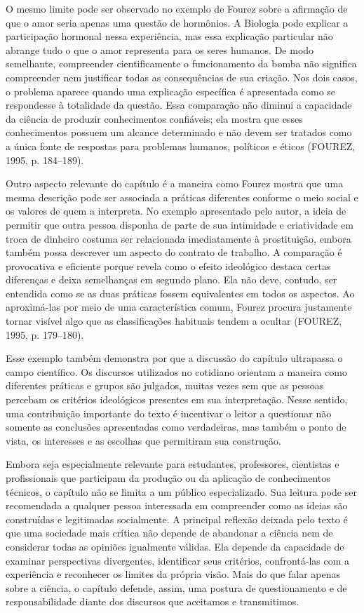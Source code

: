\documentclass[12pt,a4paper]{article}
\begin{document}
O mesmo limite pode ser observado no exemplo de Fourez sobre a afirmação de
que o amor seria apenas uma questão de hormônios. A Biologia pode explicar a
participação hormonal nessa experiência, mas essa explicação particular não
abrange tudo o que o amor representa para os seres humanos. De modo
semelhante, compreender cientificamente o funcionamento da bomba não
significa compreender nem justificar todas as consequências de sua criação.
Nos dois casos, o problema aparece quando uma explicação específica é
apresentada como se respondesse à totalidade da questão. Essa comparação não
diminui a capacidade da ciência de produzir conhecimentos confiáveis; ela
mostra que esses conhecimentos possuem um alcance determinado e não devem
ser tratados como a única fonte de respostas para problemas humanos,
políticos e éticos (FOUREZ, 1995, p. 184--189).

Outro aspecto relevante do capítulo é a maneira como Fourez mostra que uma
mesma descrição pode ser associada a práticas diferentes conforme o meio
social e os valores de quem a interpreta. No exemplo apresentado pelo autor,
a ideia de permitir que outra pessoa disponha de parte de sua intimidade e
criatividade em troca de dinheiro costuma ser relacionada imediatamente à
prostituição, embora também possa descrever um aspecto do contrato de
trabalho. A comparação é provocativa e eficiente porque revela como o efeito
ideológico destaca certas diferenças e deixa semelhanças em segundo plano.
Ela não deve, contudo, ser entendida como se as duas práticas fossem
equivalentes em todos os aspectos. Ao aproximá-las por meio de uma
característica comum, Fourez procura justamente tornar visível algo que as
classificações habituais tendem a ocultar (FOUREZ, 1995, p. 179--180).

Esse exemplo também demonstra por que a discussão do capítulo ultrapassa o
campo científico. Os discursos utilizados no cotidiano orientam a maneira
como diferentes práticas e grupos são julgados, muitas vezes sem que as
pessoas percebam os critérios ideológicos presentes em sua interpretação.
Nesse sentido, uma contribuição importante do texto é incentivar o leitor a
questionar não somente as conclusões apresentadas como verdadeiras, mas
também o ponto de vista, os interesses e as escolhas que permitiram sua
construção.

Embora seja especialmente relevante para estudantes, professores,
cientistas e profissionais que participam da produção ou da aplicação de
conhecimentos técnicos, o capítulo não se limita a um público especializado.
Sua leitura pode ser recomendada a qualquer pessoa interessada em
compreender como as ideias são construídas e legitimadas socialmente. A
principal reflexão deixada pelo texto é que uma sociedade mais crítica não
depende de abandonar a ciência nem de considerar todas as opiniões
igualmente válidas. Ela depende da capacidade de examinar perspectivas
divergentes, identificar seus critérios, confrontá-las com a experiência e
reconhecer os limites da própria visão. Mais do que falar apenas sobre a
ciência, o capítulo defende, assim, uma postura de questionamento e de
responsabilidade diante dos discursos que aceitamos e transmitimos.
\end{document}
